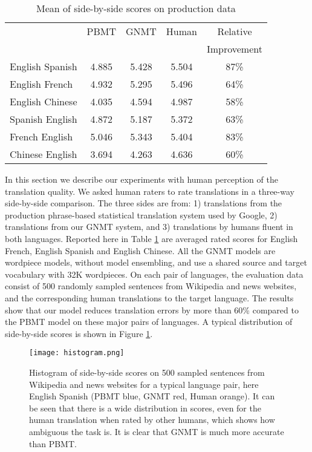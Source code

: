 \begin{table}[h!]
\caption{Mean of side-by-side scores on production data} \centering
\begin{tabular}{l c c c c }
\hline\hline & PBMT & GNMT & Human & Relative\\ [0.5ex]
	&      &      &       & Improvement\\ [0.5ex]
\hline English  Spanish     & 4.885 & 5.428 & 5.504 & 87\%\\ English  French	  & 4.932 & 5.295 & 5.496 & 64\%\\ English  Chinese     & 4.035 & 4.594 & 4.987 & 58\%\\ Spanish  English     & 4.872 & 5.187 & 5.372 & 63\%\\ French   English	  & 5.046 & 5.343 & 5.404 & 83\%\\ Chinese  English     & 3.694 & 4.263 & 4.636 & 60\%\\ \hline \end{tabular}
\label{table:prod}
\end{table}

In this section we describe our experiments with human perception of the
translation quality. We asked human raters to rate translations in
a three-way side-by-side comparison.  The three sides are from: 1) translations 
from the production phrase-based statistical translation system used by Google, 
2) translations from our GNMT system, and 3) translations by humans fluent in 
both languages.  Reported here in Table \ref{table:prod} are averaged rated 
scores for English
 French, English  Spanish and
English 
Chinese. All the GNMT models are wordpiece models, without model
ensembling, and use a shared source and target vocabulary with 32K wordpieces. 
On each pair of languages, the evaluation data consist of 500
randomly sampled sentences from Wikipedia and news websites, and the
corresponding human translations to the target language. The
results show that our model reduces translation errors by more than 60\%
compared to the PBMT model on these major pairs of languages. A typical
distribution of side-by-side scores is shown in Figure \ref{fig:histogram}.

\begin{figure}[h!]
\centering
\texttt{[image: histogram.png]}
\caption{Histogram of side-by-side scores on 500 sampled sentences from Wikipedia and news websites for a typical language pair, here English  Spanish (PBMT blue, GNMT red, Human orange). It can be seen that there is a wide distribution in scores, even for the human translation when rated by other humans, which shows how ambiguous the task is. It is clear that GNMT is much more accurate than PBMT.}
\label{fig:histogram}
\end{figure}

